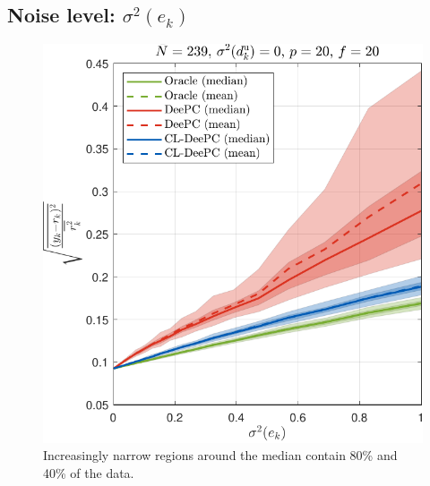 \subsection{Noise level: $\sigma^2(e_k)$}
\begin{figure}[b!]
\begin{center}
\includegraphics[width=\columnwidth]{results/figures/Varying_Re_0.0001-1-50_Nbar_239_p_20_f_20_Ru_1_Rdu_0_Q_100_R_0_dR_10.pdf}    %
\caption{Increasingly narrow regions around the median contain 80\% and 40\% of the data.}  %
\label{fig:varying_Re}                                 %
\end{center}                                 %
\end{figure}

